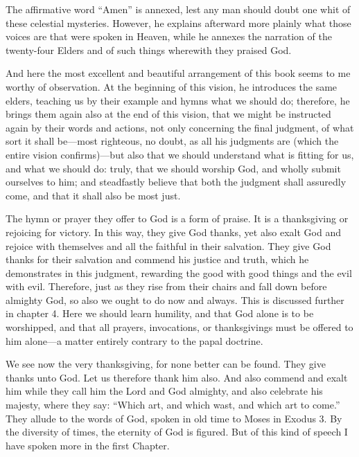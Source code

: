 The affirmative word “Amen” is annexed, lest any man should doubt one whit of these celestial mysteries. However, he explains afterward more plainly what those voices are that were spoken in Heaven, while he annexes the narration of the twenty-four Elders and of such things wherewith they praised God.

And here the most excellent and beautiful arrangement of this book seems to me worthy of observation. At the beginning of this vision, he introduces the same elders, teaching us by their example and hymns what we should do; therefore, he brings them again also at the end of this vision, that we might be instructed again by their words and actions, not only concerning the final judgment, of what sort it shall be—most righteous, no doubt, as all his judgments are (which the entire vision confirms)—but also that we should understand what is fitting for us, and what we should do: truly, that we should worship God, and wholly submit ourselves to him; and steadfastly believe that both the judgment shall assuredly come, and that it shall also be most just.

The hymn or prayer they offer to God is a form of praise. It is a thanksgiving or rejoicing for victory. In this way, they give God thanks, yet also exalt God and rejoice with themselves and all the faithful in their salvation. They give God thanks for their salvation and commend his justice and truth, which he demonstrates in this judgment, rewarding the good with good things and the evil with evil. Therefore, just as they rise from their chairs and fall down before almighty God, so also we ought to do now and always. This is discussed further in chapter 4. Here we should learn humility, and that God alone is to be worshipped, and that all prayers, invocations, or thanksgivings must be offered to him alone—a matter entirely contrary to the papal doctrine.

We see now the very thanksgiving, for none better can be found. They give thanks unto God. Let us therefore thank him also. And also commend and exalt him while they call him the Lord and God almighty, and also celebrate his majesty, where they say: “Which art, and which wast, and which art to come.” They allude to the words of God, spoken in old time to Moses in Exodus 3. By the diversity of times, the eternity of God is figured. But of this kind of speech I have spoken more in the first Chapter.

